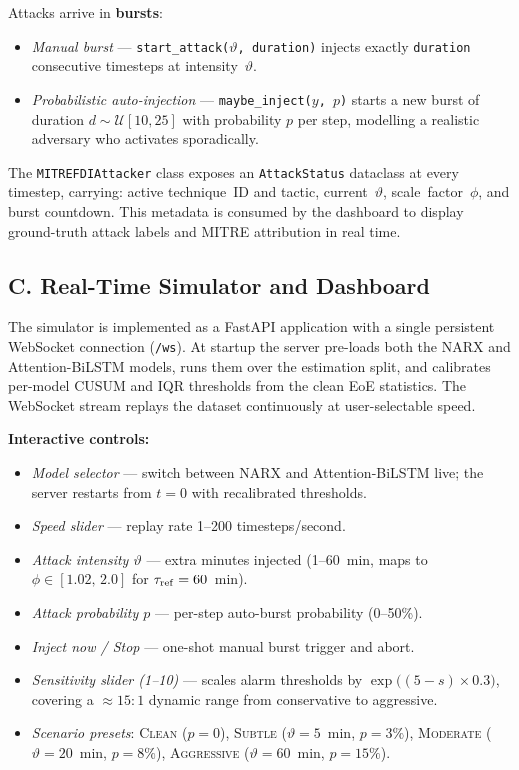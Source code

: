 \documentclass[journal]{IEEEtran}
\begin{document}
Attacks arrive in \textbf{bursts}:
\begin{itemize}
  \item \emph{Manual burst} --- \texttt{start\_attack($\vartheta$,
    duration)} injects exactly \texttt{duration} consecutive
    timesteps at intensity~$\vartheta$.
  \item \emph{Probabilistic auto-injection} ---
    \texttt{maybe\_inject($y$,\,$p$)} starts a new burst of duration
    $d \sim \mathcal{U}[10,25]$ with probability $p$ per step,
    modelling a realistic adversary who activates sporadically.
\end{itemize}
The \texttt{MITREFDIAttacker} class exposes an \texttt{AttackStatus}
dataclass at every timestep, carrying: active technique~ID and tactic,
current~$\vartheta$, scale~factor~$\phi$, and burst countdown.
This metadata is consumed by the dashboard to display ground-truth
attack labels and MITRE attribution in real time.

\subsection*{C.\; Real-Time Simulator and Dashboard}

The simulator is implemented as a FastAPI application with a single
persistent WebSocket connection (\texttt{/ws}).
At startup the server pre-loads both the NARX and Attention-BiLSTM
models, runs them over the estimation split, and calibrates per-model
CUSUM and IQR thresholds from the clean EoE statistics.
The WebSocket stream replays the dataset continuously at
user-selectable speed.

\medskip
\noindent\textbf{Interactive controls:}
\begin{itemize}
  \item \emph{Model selector} --- switch between NARX and
    Attention-BiLSTM live; the server restarts from $t=0$ with
    recalibrated thresholds.
  \item \emph{Speed slider} --- replay rate 1--200 timesteps/second.
  \item \emph{Attack intensity $\vartheta$} --- extra minutes injected
    (1--60~min, maps to $\phi \in [1.02,\,2.0]$ for
    $\tau_{\rm ref}=60$~min).
  \item \emph{Attack probability $p$} --- per-step auto-burst
    probability (0--50\%).
  \item \emph{Inject now / Stop} --- one-shot manual burst trigger
    and abort.
  \item \emph{Sensitivity slider (1--10)} --- scales alarm thresholds
    by $\exp\!\bigl((5-s)\times0.3\bigr)$, covering a $\approx15:1$
    dynamic range from conservative to aggressive.
  \item \emph{Scenario presets}: \textsc{Clean} ($p=0$),
    \textsc{Subtle} ($\vartheta=5$~min, $p=3\%$),
    \textsc{Moderate} ($\vartheta=20$~min, $p=8\%$),
    \textsc{Aggressive} ($\vartheta=60$~min, $p=15\%$).
\end{itemize}
\end{document}
